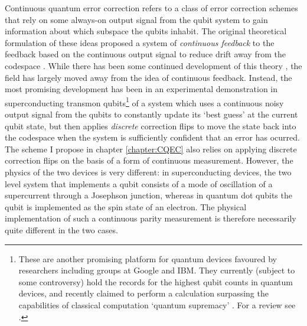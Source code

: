 \documentclass{report}
\begin{document}
Continuous quantum error correction refers to a class of error correction schemes that rely on some always-on output signal from the qubit system to gain information about which subspace the qubits inhabit. The original theoretical formulation of these ideas proposed a system of \textit{continuous feedback} to the feedback based on the continuous output signal to reduce drift away from the codespace \cite{Ahn2002}. While there has been some continued development of this theory \cite{Cardona2018}\cite{Cardona2019}, the field has largely moved away from the idea of continuous feedback. Instead, the most promising development has been in an experimental demonstration in superconducting transmon qubits\footnote{These are another promising platform for quantum devices favoured by researchers including groups at Google and IBM. They currently (subject to some controversy) hold the records for the highest qubit counts in quantum devices, and recently claimed to perform a calculation surpassing the capabilities of classical computation `quantum supremacy' \cite{Arute2019}. For a review see \cite{Huang2020}.} of a system which uses a continuous noisy output signal from the qubits to constantly update its `best guess' at the current qubit state, but then applies \textit{discrete} correction flips to move the state back into the codespace when the system is sufficiently confident that an error has ocurred\cite{Dressel2022}. The scheme I propose in chapter \ref{chapter:CQEC} also relies on applying discrete correction flips on the basis of a form of continuous measurement. However, the physics of the two devices is very different: in superconducting devices, the two level system that implements a qubit consists of a mode of oscillation of a supercurrent through a Josephson junction, whereas in quantum dot qubits the qubit is implemented as the spin state of an electron. The physical implementation of such a continuous parity measurement is therefore necessarily quite different in the two cases.
\end{document}
